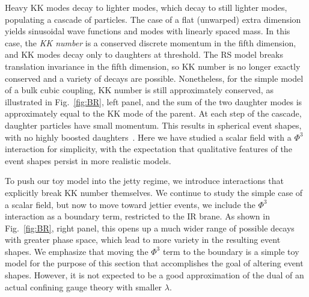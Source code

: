 Heavy KK modes decay to lighter modes, which decay to still lighter modes, populating a cascade of particles. The case of a flat (unwarped) extra dimension yields sinusoidal wave functions and modes with linearly spaced mass. In this case, the \emph{KK number} is a conserved discrete momentum in the fifth dimension, and KK modes decay only to daughters at threshold. The RS model breaks translation invariance in the fifth dimension, so KK number is no longer exactly conserved and a variety of decays are possible. Nonetheless, for the simple model of a bulk cubic coupling, KK number is still approximately conserved, as illustrated in Fig.~\ref{fig:BR}, left panel, and the sum of the two daughter modes is approximately equal to the KK mode of the parent. At each step of the cascade, daughter particles have small momentum. This results in spherical event shapes, with no highly boosted daughters~\cite{Csaki:2008dt}. Here we have studied a scalar field with a $\Phi^3$ interaction for simplicity, with the expectation that qualitative features of the event shapes persist in more realistic models.

To push our toy model into the jetty regime, we introduce interactions that explicitly break KK number themselves. We continue to study the simple case of a scalar field, but now to move toward jettier events, we include the $\Phi^3$ interaction as a boundary term, restricted to the IR brane. As shown in Fig.~\ref{fig:BR}, right panel, this opens up a much wider range of possible decays with greater phase space, which lead to more variety in the resulting event shapes. We emphasize that moving the $\Phi^3$ term to the boundary is a simple toy model for the purpose of this section that accomplishes the goal of altering event shapes. However, it is not expected to be a good approximation of the dual of an actual confining gauge theory with smaller $\lambda$.

